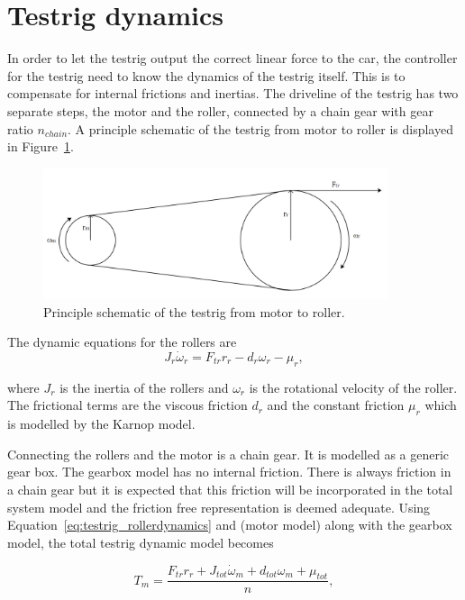 \section{Testrig dynamics}\label{sec:rigdynamics}
In order to let the testrig output the correct linear force to the car, the
controller for the testrig need to know the dynamics of the testrig itself. This
is to compensate for internal frictions and inertias. The driveline of the
testrig has two separate steps, the motor and the roller, connected by a chain
gear with gear ratio $n_{chain}$. A principle schematic of the testrig from
motor to roller is displayed in Figure~\ref{fig:testrig_testrigdynamics}.
\begin{figure}[H]
    \centering
    \includegraphics[width=0.9\textwidth]{./img/testrig_rollerschematic.png}
    \caption{Principle schematic of the testrig from motor to roller.}\label{fig:testrig_testrigdynamics}
\end{figure}
The dynamic equations for the rollers are
\begin{equation} \label{eq:testrig_rollerdynamics}
    J_r \dot{\omega}_r = F_{tr}r_r - d_r \omega_r - \mu_r,
\end{equation}

where $J_r$ is the inertia of the rollers and $\omega_r$ is the rotational velocity
of the roller. The frictional terms are the viscous friction $d_r$ and the
constant friction $\mu_r$ which is modelled by the Karnop model.

Connecting the rollers and the motor is a chain gear. It is modelled as a
generic gear box. The gearbox model has no internal friction. There is always friction in a
chain gear but it is expected that this friction will be incorporated in the
total system model and the friction free representation is deemed adequate.
Using Equation~\ref{eq:testrig_rollerdynamics} and (motor model) along with
the gearbox model, the total testrig dynamic model becomes

\begin{equation} \label{eq:testrig_totaldynamics} 
    T_m = \frac{F_{tr} r_r + J_{tot} \dot{\omega}_m + d_{tot} \omega_m + \mu_{tot}}{n},
\end{equation}

